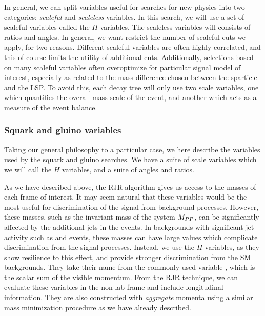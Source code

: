 In general, we can split variables useful for searches for new physics into two categories: \textit{scaleful} and \textit{scaleless} variables.
In this search, we will use a set of scaleful variables called the $H$ variables.
The scaleless variables will consists of ratios and angles.
In general, we want restrict the number of scaleful cuts we apply, for two reasons.
Different scaleful variables are often highly correlated, and this of course limits the utility of additional cuts.
Additionally, selections based on many scaleful variables often overoptimize for particular signal model of interest, especially as related to the mass difference chosen between the sparticle and the LSP.
To avoid this, each decay tree will only use two scale variables, one which quantifies the overall mass scale of the event, and another which acts as a measure of the event balance.

\subsubsection{Squark and gluino variables}

Taking our general philosophy to a particular case, we here describe the variables used by the squark and gluino searches.
We have a suite of scale variables which we will call the $H$ variables, and a suite of angles and ratios.

As we have described above, the RJR algorithm gives us access to the masses of each frame of interest.
It may seem natural that these variables would be the most useful for discrimination of the signal from background processes.
However, these masses, such as the invariant mass of the \PP system $M_{PP }$, can be significantly affected by the additional jets in the events.
In backgrounds with significant jet activity such as \zjets and \wjets events, these masses can have large values which complicate discrimination from the signal processes.
Instead, we use the $H$ variables, as they show resilience to this effect, and provide stronger discrimination from the SM backgrounds.
They take their name from the commonly used variable \HT, which is the scalar sum of the visible momentum.
From the RJR technique, we can evaluate these variables in the non-lab frame and include longitudinal information.
They are also constructed with \textit{aggregate} momenta using a similar mass minimization procedure as we have already described.

